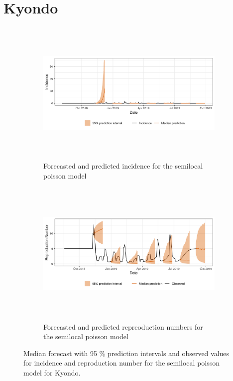  \section{ Kyondo }\begin{figure}[H]\begin{subfigure}{\textwidth}  \centering  \includegraphics[width=0.9\linewidth, height=7cm]{../output/Kyondo_predictions.png}  \caption{Forecasted and predicted incidence for the semilocal poisson model}\end{subfigure}

\begin{subfigure}{\textwidth}  \centering  \includegraphics[width=0.9\linewidth, height=7cm]{../output/Kyondo_Rs.png}  \caption{Forecasted and predicted repreoduction numbers for the semilocal poisson model}\end{subfigure}  \caption{Median forecast with 95 \% prediction intervals and observed values for incidence and reproduction number for the semilocal poisson model for Kyondo.}\end{figure}

